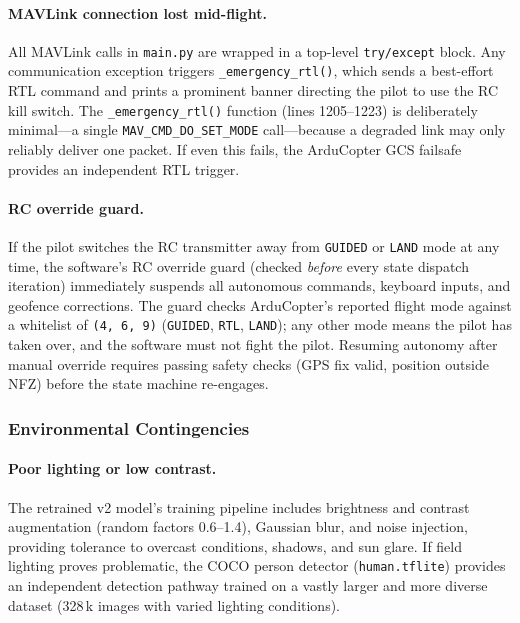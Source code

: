 \paragraph{MAVLink connection lost mid-flight.}
All MAVLink calls in \texttt{main.py} are wrapped in a top-level \texttt{try/except} block.  Any communication exception triggers \texttt{\_emergency\_rtl()}, which sends a best-effort RTL command and prints a prominent banner directing the pilot to use the RC kill switch.  The \texttt{\_emergency\_rtl()} function (lines 1205--1223) is deliberately minimal---a single \texttt{MAV\_CMD\_DO\_SET\_MODE} call---because a degraded link may only reliably deliver one packet.  If even this fails, the ArduCopter GCS failsafe provides an independent RTL trigger.

\paragraph{RC override guard.}
If the pilot switches the RC transmitter away from \texttt{GUIDED} or \texttt{LAND} mode at any time, the software's RC override guard (checked \emph{before} every state dispatch iteration) immediately suspends all autonomous commands, keyboard inputs, and geofence corrections.  The guard checks ArduCopter's reported flight mode against a whitelist of \texttt{(4, 6, 9)} (\texttt{GUIDED}, \texttt{RTL}, \texttt{LAND}); any other mode means the pilot has taken over, and the software must not fight the pilot.  Resuming autonomy after manual override requires passing safety checks (GPS fix valid, position outside NFZ) before the state machine re-engages.

\subsubsection{Environmental Contingencies}\label{sec:env-contingencies}

\paragraph{Poor lighting or low contrast.}
The retrained v2 model's training pipeline includes brightness and contrast augmentation (random factors 0.6--1.4), Gaussian blur, and noise injection, providing tolerance to overcast conditions, shadows, and sun glare.  If field lighting proves problematic, the COCO person detector (\texttt{human.tflite}) provides an independent detection pathway trained on a vastly larger and more diverse dataset (328\,k images with varied lighting conditions).

